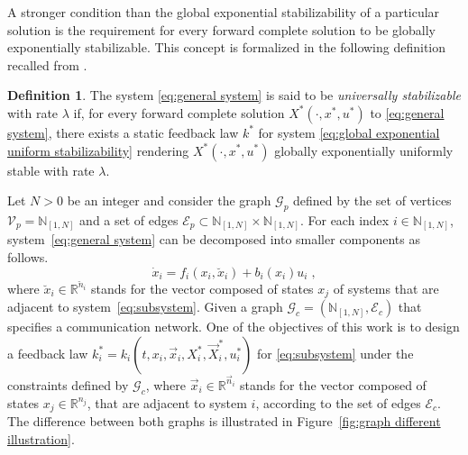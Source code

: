 \documentclass[10pt,twocolumn,twoside]{IEEEtran}
\newcounter{para}
\newcommand\mypara{\par}
\theoremstyle{plain}
\theoremstyle{definition}
\newtheorem{definition}{Definition}
\theoremstyle{remark}
\begin{document}
\mypara A stronger condition than the global exponential stabilizability of a particular solution is the requirement for every forward complete solution to be globally exponentially stabilizable. This concept is formalized in the following definition recalled from \cite{Manchester2014a}.

\begin{definition}\label{def:US}
	The system \eqref{eq:general system} is said to be \emph{universally stabilizable} with rate $\lambda$ if, for every forward complete solution $X^\ast(\cdot,x^\ast,u^\ast)$ to \eqref{eq:general system}, there exists a static feedback law $k^\ast$ for system \eqref{eq:global exponential uniform stabilizability} rendering $X^\ast(\cdot,x^\ast,u^\ast)$ globally exponentially uniformly stable with rate $\lambda$.
\end{definition}

\mypara Let $N>0$ be an integer and consider the graph $\mathscr{G}_p$ defined by the set of vertices $\mathscr{V}_p=\mathbb{N}_{[1,N]}$ and a set of edges $\mathscr{E}_p\subset\mathbb{N}_{[1,N]}\times\mathbb{N}_{[1,N]}$. For each index $i\in\mathbb{N}_{[1,N]}$, system~\eqref{eq:general system} can be decomposed into smaller components as follows.
\begin{equation}\label{eq:subsystem}
	\dot{x}_i=f_i(x_i,\breve{x}_i)+b_i(x_i)u_i\;,
\end{equation}
where $\breve{x}_i\in\mathbb{R}^{\breve{n}_i}$ stands for the vector composed of states $x_j$ of systems that are adjacent to system~\eqref{eq:subsystem}. Given a graph $\mathscr{G}_c=(\mathbb{N}_{[1,N]},\mathscr{E}_c)$ that specifies a communication network. One of the objectives of this work is to design a feedback law $k_i^\ast=k_i(t,x_i,\vec{x}_i,X_i^\ast,\vec{X}_i^\ast,u_i^\ast)$ for \eqref{eq:subsystem} under the constraints defined by $\mathscr{G}_c$, where $\vec{x}_i\in\mathbb{R}^{\vec{n}_i}$ stands for the vector composed of states $x_j\in\mathbb{R}^{n_j}$, that are adjacent to system $i$, according to the set of edges $\mathscr{E}_c$. The difference between both graphs is illustrated in Figure~\ref{fig:graph different illustration}.
\end{document}
